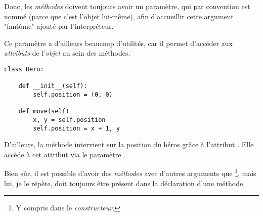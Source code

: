 Donc, les \emph{méthodes} doivent toujours avoir un paramètre, qui par convention est nommé  (parce que c'est l'objet lui-même), afin d'accueillir cette argument "fantôme" ajouté par l'interpréteur.

Ce paramètre a d'ailleurs beaucoup d'utilités, car il permet d'accéder aux \emph{attributs} de l'\emph{objet} au sein des méthodes.

\begin{lstlisting}
class Hero:

	def __init__(self):
		self.position = (0, 0)
		
	def move(self)
		x, y = self.position
		self.position = x + 1, y
\end{lstlisting}

D'ailleurs, la méthode  intervient sur la position du héros grâce à l'attribut . Elle accède à cet attribut via le paramètre .

Bien sûr, il est possible d'avoir des \emph{méthodes} avec d'autres arguments que \footnote{Y compris dans le \emph{constructeur}.}, mais lui, je le répète, doit toujours être présent dans la déclaration d'une méthode.
